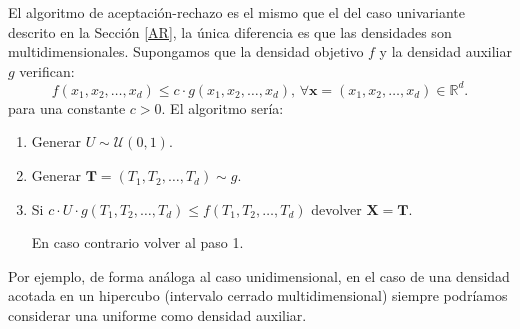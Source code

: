 \documentclass[
]{book}
\theoremstyle{break}
\theoremstyle{nonumberplain}
\begin{document}
El algoritmo de aceptación-rechazo es el mismo que el del caso univariante descrito en la Sección \ref{AR}, la única diferencia es que las densidades son multidimensionales.
Supongamos que la densidad objetivo \(f\) y la densidad
auxiliar \(g\) verifican:
\[f\left( x_1,x_2,\ldots,x_d\right) \leq c\cdot g\left( x_1,x_2,\ldots,x_d\right) 
\text{, }\forall \mathbf{x} = \left( x_1,x_2,\ldots,x_d\right)\in \mathbb{R}^d\text{.}\]
para una constante \(c>0\).
El algoritmo sería:

\begin{enumerate}
\def\labelenumi{\arabic{enumi}.}
\item
  Generar \(U\sim \mathcal{U}\left( 0,1\right)\).
\item
  Generar \(\mathbf{T} = \left( T_1,T_2,\ldots,T_d\right) \sim g\).
\item
  Si \(c\cdot U\cdot g\left( T_1,T_2,\ldots,T_d\right) \leq f\left( T_1,T_2,\ldots,T_d\right)\)
  devolver \(\mathbf{X}=\mathbf{T}\).

  En caso contrario volver al paso 1.
\end{enumerate}

Por ejemplo, de forma análoga al caso unidimensional, en el caso de una densidad
acotada en un hipercubo (intervalo cerrado multidimensional) siempre podríamos considerar
una uniforme como densidad auxiliar.
\end{document}
